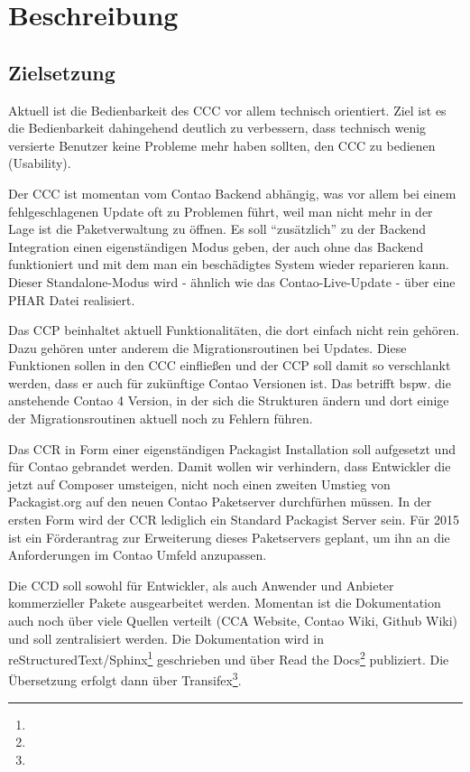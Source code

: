 \documentclass[
paper=a4,
draft=false,%
fontsize=10pt%
]{scrartcl}
\begin{document}
%
%

\newpage

\section{Beschreibung}
\label{sec:description}

\subsection{Zielsetzung}

Aktuell ist die Bedienbarkeit des CCC vor allem technisch orientiert. Ziel ist es die Bedienbarkeit dahingehend deutlich zu verbessern, dass technisch wenig versierte Benutzer keine Probleme mehr haben sollten, den CCC zu bedienen (Usability).

Der CCC ist momentan vom Contao Backend abhängig, was vor allem bei einem fehlgeschlagenen Update oft zu Problemen führt, weil man nicht mehr in der Lage ist die Paketverwaltung zu öffnen. Es soll “zusätzlich” zu der Backend Integration einen eigenständigen Modus geben, der auch ohne das Backend funktioniert und mit dem man ein beschädigtes System wieder reparieren kann. Dieser Standalone-Modus wird - ähnlich wie das Contao-Live-Update - über eine PHAR Datei realisiert.

Das CCP beinhaltet aktuell Funktionalitäten, die dort einfach nicht rein gehören. Dazu gehören unter anderem die Migrationsroutinen bei Updates. Diese Funktionen sollen in den CCC einfließen und der CCP soll damit so verschlankt werden, dass er auch für zukünftige Contao Versionen ist. Das betrifft bspw. die anstehende Contao 4 Version, in der sich die Strukturen ändern und dort einige der Migrationsroutinen aktuell noch zu Fehlern führen.

Das CCR in Form einer eigenständigen Packagist Installation soll aufgesetzt und für Contao gebrandet werden. Damit wollen wir verhindern, dass Entwickler die jetzt auf Composer umsteigen, nicht noch einen zweiten Umstieg von Packagist.org auf den neuen Contao Paketserver durchfürhen müssen. In der ersten Form wird der CCR lediglich ein Standard Packagist Server sein. Für 2015 ist ein Förderantrag zur Erweiterung dieses Paketservers geplant, um ihn an die Anforderungen im Contao Umfeld anzupassen.

Die CCD soll sowohl für Entwickler, als auch Anwender und Anbieter kommerzieller Pakete ausgearbeitet werden. Momentan ist die Dokumentation auch noch über viele Quellen verteilt (CCA Website, Contao Wiki, Github Wiki) und soll zentralisiert werden. Die Dokumentation wird in reStructuredText/Sphinx\footnote{} geschrieben und über Read the Docs\footnote{} publiziert. Die Übersetzung erfolgt dann über Transifex\footnote{}.
\end{document}
